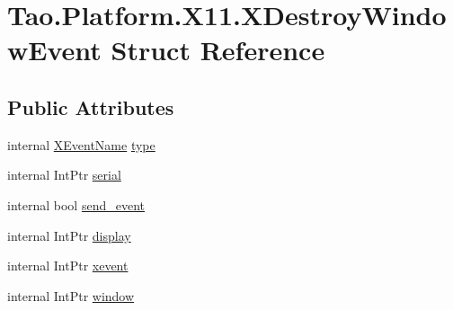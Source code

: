 \hypertarget{struct_tao_1_1_platform_1_1_x11_1_1_x_destroy_window_event}{
\section{Tao.Platform.X11.XDestroyWindowEvent Struct Reference}
\label{struct_tao_1_1_platform_1_1_x11_1_1_x_destroy_window_event}
}
\subsection*{Public Attributes}
\begin{DoxyCompactItemize}
\item 
internal \hyperlink{namespace_tao_1_1_platform_1_1_x11_aff81ed5b8778e1ea8e872861dff9f146}{XEventName} \hyperlink{struct_tao_1_1_platform_1_1_x11_1_1_x_destroy_window_event_a351c579972c4933ea398b3704ea9561a}{type}
\item 
internal IntPtr \hyperlink{struct_tao_1_1_platform_1_1_x11_1_1_x_destroy_window_event_a7d0b5d9db01650e70a55857957c0d3b3}{serial}
\item 
internal bool \hyperlink{struct_tao_1_1_platform_1_1_x11_1_1_x_destroy_window_event_a1f0832d8c794d428576bcabc60914cf3}{send\_\-event}
\item 
internal IntPtr \hyperlink{struct_tao_1_1_platform_1_1_x11_1_1_x_destroy_window_event_a2faa57236d96bb1f22bbc0ebb14dd21f}{display}
\item 
internal IntPtr \hyperlink{struct_tao_1_1_platform_1_1_x11_1_1_x_destroy_window_event_a7a93805c6ba1c0a9d46bdd7d7dd8b71d}{xevent}
\item 
internal IntPtr \hyperlink{struct_tao_1_1_platform_1_1_x11_1_1_x_destroy_window_event_ab8c6755e1876b30e29e8fed0bc97882a}{window}
\end{DoxyCompactItemize}


